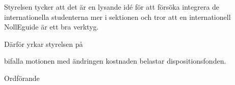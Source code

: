 \documentclass[../_main/handlingar.tex]{subfiles}
\begin{document}
\motionssvar

Styrelsen tycker att det är en lysande idé för att försöka integrera de internationella studenterna mer i sektionen och tror att en internationell NollEguide är ett bra verktyg.

Därför yrkar styrelsen på 

\begin{attsatser}
    \att bifalla motionen med ändringen
    \att kostnaden belastar dispositionsfonden.
\end{attsatser}

\begin{signatures}{1}
    \ist
    \signature{Daniel Bakic}{Ordförande}
\end{signatures}
\end{document}
